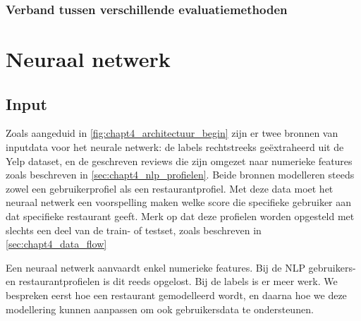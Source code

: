 




\subsubsection{Verband tussen verschillende evaluatiemethoden}
\label{sub:chapt4_compare_eval_methods}

\section{Neuraal netwerk}
\label{sec:chapt4_neuraal_netwerk}

\subsection{Input}
Zoals aangeduid in \autoref{fig:chapt4_architectuur_begin} zijn er twee bronnen van inputdata voor het neurale netwerk: de labels rechtstreeks geëxtraheerd uit de Yelp dataset, en de geschreven reviews die zijn omgezet naar numerieke features zoals beschreven in \autoref{sec:chapt4_nlp_profielen}. Beide bronnen modelleren steeds zowel een gebruikerprofiel als een restaurantprofiel. Met deze data moet het neuraal netwerk een voorspelling maken welke score die specifieke gebruiker aan dat specifieke restaurant geeft. Merk op dat deze profielen worden opgesteld met slechts een deel van de train- of testset, zoals beschreven in \autoref{sec:chapt4_data_flow} %

Een neuraal netwerk aanvaardt enkel numerieke features. Bij de NLP gebruikers- en restaurantprofielen is dit reeds opgelost. Bij de labels is er meer werk. We bespreken eerst hoe een restaurant gemodelleerd wordt, en daarna hoe we deze modellering kunnen aanpassen om ook gebruikersdata te ondersteunen.
